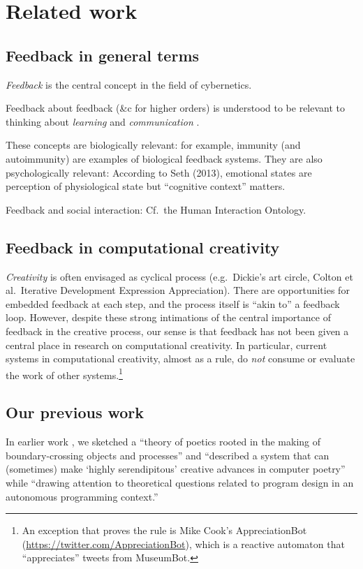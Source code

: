 \section{Related work}\label{sec:ww-model}

\subsection{Feedback in general terms}

\emph{Feedback} is the central concept in the field of cybernetics. 

Feedback about feedback (\&c for higher orders) is understood to be
relevant to thinking about \emph{learning} and \emph{communication}
\cite{geertz1973interpretation}.

These concepts are biologically relevant: for example, immunity (and
autoimmunity) are examples of biological feedback systems.  They are
also psychologically relevant: According to Seth (2013), emotional
states are perception of physiological state but ``cognitive context''
matters.

Feedback and social interaction: Cf.~the Human Interaction Ontology.

\subsection{Feedback in computational creativity}

\emph{Creativity} is often envisaged as cyclical process
(e.g.~Dickie's art circle, Colton et al.~Iterative Development
Expression Appreciation).  There are opportunities for embedded
feedback at each step, and the process itself is ``akin to'' a
feedback loop.  However, despite these strong intimations of the
central importance of feedback in the creative process, our sense is
that feedback has not been given a central place in research on
computational creativity.  In particular, current systems in
computational creativity, almost as a rule, do \emph{not} consume or
evaluate the work of other systems.\footnote{An exception that proves
  the rule is Mike Cook's {\sf AppreciationBot}
  (\url{https://twitter.com/AppreciationBot}), which is a reactive
  automaton that ``appreciates'' tweets from {\sf MuseumBot}.}

\subsection{Our previous work}

In earlier work \cite{corneli15iccc,corneli15cc}, we sketched a
``theory of poetics rooted in the making of boundary-crossing objects
and processes'' and ``described a system that can (sometimes) make
`highly serendipitous' creative advances in computer poetry'' while
``drawing attention to theoretical questions related to program design
in an autonomous programming context.''


